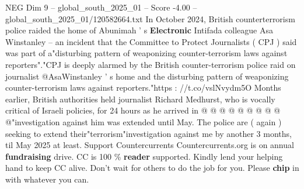 \begin{textsample}{NEG Dim 9 – global\_south\_2025\_01 – Score -4.00 – global\_south\_2025\_01/120582664.txt}
In October 2024, British counterterrorism police raided the home of Abunimah ' s \textbf{Electronic} Intifada colleague Asa Winstanley -- an incident that the Committee to Protect Journalists ( CPJ ) said was part of a"disturbing pattern of weaponizing counter-terrorism laws against reporters"."CPJ is deeply alarmed by the British counter-terrorism police raid on journalist @AsaWinstanley ' s home and the disturbing pattern of weaponizing counter-terrorism laws against reporters."https : //t.co/vslNvydm5O Months earlier, British authorities held journalist Richard Medhurst, who is vocally critical of Israeli policies, for 24 hours as he arrived in @ @ @ @ @ @ @ @ @ @"investigation against him was extended until May.
The police are ( again ) seeking to extend their"terrorism"investigation against me by another 3 months, til May 2025 at least.
Support Countercurrents Countercurrents.org is on annual \textbf{fundraising} drive.
CC is 100 \% \textbf{reader} supported.
Kindly lend your helping hand to keep CC alive.
Don't wait for others to do the job for you.
Please \textbf{chip} in with whatever you can.

\end{textsample}
